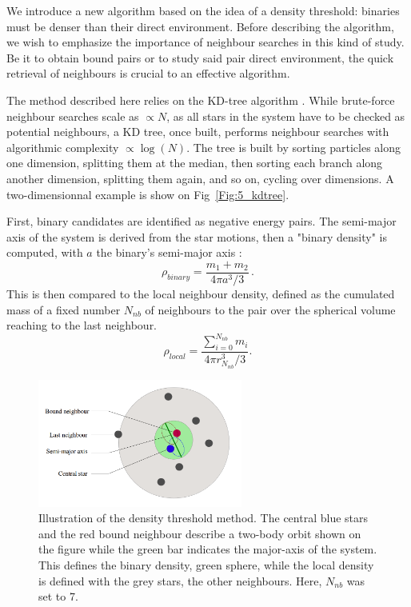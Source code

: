 We introduce a new algorithm based on the idea of a density threshold: binaries must be denser than their direct environment. Before describing the algorithm, we wish to emphasize the importance of neighbour searches in this kind of study. Be it to obtain bound pairs or to study said pair direct environment, the quick retrieval of neighbours is crucial to an effective algorithm.

The method described here relies on the KD-tree algorithm \citep{numericalrecipes}. While brute-force neighbour searches scale as $\propto N$, as all stars in the system have to be checked as potential neighbours, a KD tree, once built, performs neighbour searches with algorithmic complexity $\propto\log (N)$. The tree is built by sorting particles along one dimension, splitting them at the median, then sorting each branch along another dimension, splitting them again, and so on, cycling over dimensions. A two-dimensionnal example is show on Fig~\ref{Fig:5_kdtree}.





First, binary candidates are identified as negative energy pairs. The semi-major axis of the system is derived from the star motions, then a "binary density" is computed, with $a$ the binary's semi-major axis :
\begin{equation}
 \rho_{binary} = \frac{m_1 + m_2 }{4\pi a^3/3 }\, .
\end{equation}
This is then compared to the local neighbour density, defined as the cumulated mass of a fixed number $N_{nb}$ of neighbours to the pair over the spherical volume reaching to the last neighbour.
\begin{equation}
 \rho_{local} =  \frac{\sum\limits_{i=0}^{N_{nb}} m_i}{ 4 \pi r_{N_{nb}}^3 /3} .
\end{equation}


\begin{figure}
\begin{center}
\includegraphics[width=0.6\textwidth]{Figures/5_neighbours}
\caption{Illustration of the density threshold method. The central blue stars and the red bound neighbour describe a two-body orbit shown on the figure while the green bar indicates the major-axis of the system. This defines the binary density, green sphere, while the local density is defined with the grey stars, the other neighbours. Here, $N_{nb}$ was set to 7. }
\label{Fig:5_neighbours}
\end{center}
\end{figure}




